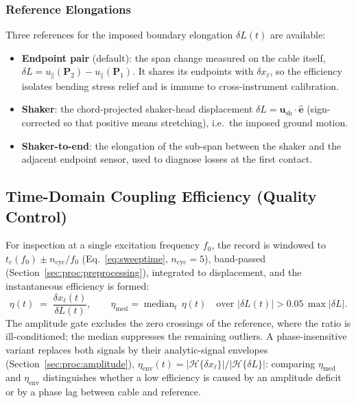 \subsubsection{Reference Elongations}
Three references for the imposed boundary elongation $\delta L(t)$ are
available:
\begin{itemize}
  \item \textbf{Endpoint pair} (default): the span change measured on the
    cable itself,
    $\delta L = u_\parallel(\mathbf{P}_2) - u_\parallel(\mathbf{P}_1)$.
    It shares its endpoints with $\delta x_\ell$, so the efficiency isolates
    bending stress relief and is immune to cross-instrument calibration.
  \item \textbf{Shaker}: the chord-projected shaker-head displacement
    $\delta L = \mathbf{u}_\mathrm{sh}\cdot\hat{\mathbf{e}}$ (sign-corrected
    so that positive means stretching), i.e.\ the imposed ground motion.
  \item \textbf{Shaker-to-end}: the elongation of the sub-span between the
    shaker and the adjacent endpoint sensor, used to diagnose losses at the
    first contact.
\end{itemize}

\subsection{Time-Domain Coupling Efficiency (Quality Control)}
\label{sec:proc:timedomain}

For inspection at a single excitation frequency $f_0$, the record is windowed
to $t_c(f_0) \pm n_\mathrm{cyc}/f_0$ (Eq.~\ref{eq:sweeptime},
$n_\mathrm{cyc}=5$), band-passed (Section~\ref{sec:proc:preprocessing}),
integrated to displacement, and the instantaneous efficiency is formed:
\begin{equation}
  \eta(t) \;=\; \frac{\delta x_\ell(t)}{\delta L(t)},
  \qquad
  \eta_\mathrm{med} = \operatorname{median}_t\, \eta(t)
  \quad\text{over } |\delta L(t)| > 0.05\,\max|\delta L| .
  \label{eq:etatime}
\end{equation}
The amplitude gate excludes the zero crossings of the reference, where the
ratio is ill-conditioned; the median suppresses the remaining outliers. A
phase-insensitive variant replaces both signals by their analytic-signal
envelopes (Section~\ref{sec:proc:amplitude}),
$\eta_\mathrm{env}(t) = |\mathcal{H}\{\delta x_\ell\}| /
|\mathcal{H}\{\delta L\}|$: comparing $\eta_\mathrm{med}$ and
$\eta_\mathrm{env}$ distinguishes whether a low efficiency is caused by an
amplitude deficit or by a phase lag between cable and reference.

